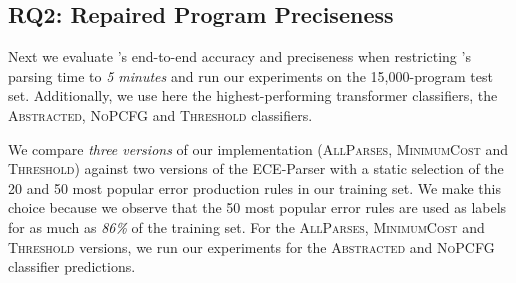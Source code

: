 \subsection{RQ2: Repaired Program Preciseness}
\label{sec:eval:precise}

Next we evaluate \toolname's end-to-end accuracy and preciseness when
restricting \toolname's parsing time to \emph{5 minutes} and run our experiments
on the 15,000-program test set. Additionally, we use here the highest-performing
transformer classifiers, \ie the \textsc{Abstracted}, \textsc{NoPCFG} and
\textsc{Threshold} classifiers.

We compare \emph{three versions} of our \toolname implementation
(\textsc{AllParses}, \textsc{MinimumCost} and \textsc{Threshold}) against two
versions of the ECE-Parser with a static selection of the 20 and 50 most popular
error production rules in our training set. We make this choice because we
observe that the 50 most popular error rules are used as labels for as much as
\emph{86\%} of the training set. For the \textsc{AllParses},
\textsc{MinimumCost} and \textsc{Threshold} versions, we run our experiments for
the \textsc{Abstracted} and \textsc{NoPCFG} classifier predictions.

